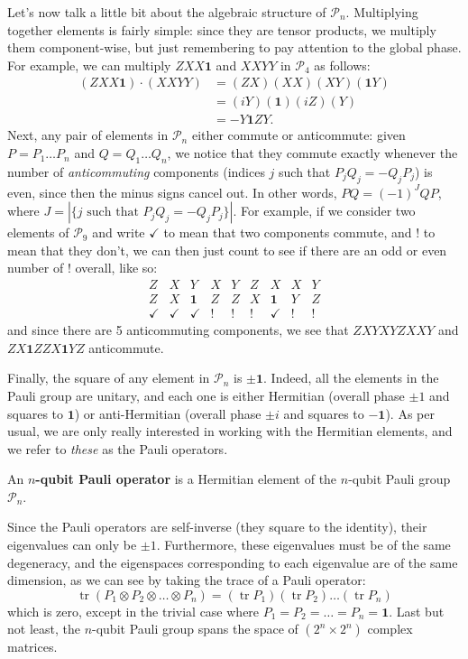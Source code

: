 \documentclass[fleqn]{article}
\newenvironment{idea}{\noindent}{\medskip}
\begin{document}
Let's now talk a little bit about the algebraic structure of \(\mathcal{P}_n\).
Multiplying together elements is fairly simple: since they are tensor products, we multiply them component-wise, but just remembering to pay attention to the global phase.
For example, we can multiply \(ZXX\mathbf{1}\) and \(XXYY\) in \(\mathcal{P}_4\) as follows:
\[
  \begin{aligned}
    (ZXX\mathbf{1})\cdot(XXYY)
    &= (ZX)(XX)(XY)(\mathbf{1}Y)
  \\&= (iY)(\mathbf{1})(iZ)(Y)
  \\&= -Y\mathbf{1}ZY.
  \end{aligned}
\]
Next, any pair of elements in \(\mathcal{P}_n\) either commute or anticommute: given \(P=P_1\ldots P_n\) and \(Q=Q_1\ldots Q_n\), we notice that they commute exactly whenever the number of \emph{anticommuting} components (indices \(j\) such that \(P_jQ_j=-Q_jP_j\)) is even, since then the minus signs cancel out.
In other words, \(PQ=(-1)^J QP\), where \(J=|\{j\text{ such that }P_jQ_j=-Q_jP_j\}|\).
For example, if we consider two elements of \(\mathcal{P}_9\) and write \(\checkmark\) to mean that two components commute, and \(!\) to mean that they don't, we can then just count to see if there are an odd or even number of \(!\) overall, like so:
\[
  \begin{array}{ccccccccc}
    Z&X&Y&X&Y&Z&X&X&Y
  \\Z&X&\mathbf{1}&Z&Z&X&\mathbf{1}&Y&Z
  \\\hline
    \checkmark&\checkmark&\checkmark&!&!&!&\checkmark&!&!
  \end{array}
\]
and since there are 5 anticommuting components, we see that \(ZXYXYZXXY\) and \(ZX\mathbf{1}ZZX\mathbf{1}YZ\) anticommute.

Finally, the square of any element in \(\mathcal{P}_n\) is \(\pm\mathbf{1}\).
Indeed, all the elements in the Pauli group are unitary, and each one is either Hermitian (overall phase \(\pm1\) and squares to \(\mathbf{1}\)) or anti-Hermitian (overall phase \(\pm i\) and squares to \(-\mathbf{1}\)).
As per usual, we are only really interested in working with the Hermitian elements, and we refer to \emph{these} as the Pauli operators.

\begin{idea}
An \textbf{\(n\)-qubit Pauli operator} is a Hermitian element of the \(n\)-qubit Pauli group \(\mathcal{P}_n\).

\end{idea}

Since the Pauli operators are self-inverse (they square to the identity), their eigenvalues can only be \(\pm1\).
Furthermore, these eigenvalues must be of the same degeneracy, and the eigenspaces corresponding to each eigenvalue are of the same dimension, as we can see by taking the trace of a Pauli operator:
\[
  \operatorname{tr}(P_1\otimes P_2\otimes\ldots\otimes P_n) = (\operatorname{tr}P_1)(\operatorname{tr}P_2)\ldots(\operatorname{tr}P_n)
\]
which is zero, except in the trivial case where \(P_1=P_2=\ldots=P_n=\mathbf{1}\).
Last but not least, the \(n\)-qubit Pauli group spans the space of \((2^n\times 2^n)\) complex matrices.
\end{document}

